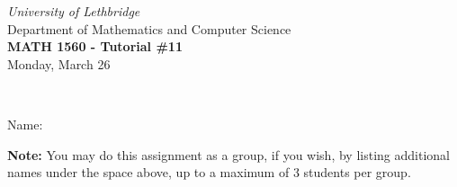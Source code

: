 \documentclass[12pt]{article}
\newcommand{\skipline}{\vspace{12pt}}
\begin{document}
\author{Instructor: Sean Fitzpatrick}
\thispagestyle{empty}
\begin{center}
\emph{University of Lethbridge}\\
Department of Mathematics and Computer Science\\
{\bf MATH 1560 - Tutorial \#11}\\
Monday, March 26
\end{center}
\skipline \ \noindent \skipline

\skipline
Name:\underline{\hspace{348pt}}\\
\skipline

\vspace{4cm}

\textbf{Note:} You may do this assignment as a group, if you wish, by listing additional names under the space above, up to a maximum of 3 students per group.

\newpage
\end{document}
